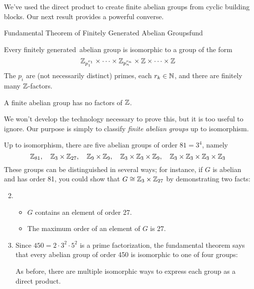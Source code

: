 We've used the direct product to create finite abelian groups from cyclic building blocks. Our next result provides a powerful converse.

\begin{thm}{Fundamental Theorem of Finitely Generated Abelian Groups}{fund}\par
Every finitely generated\footnotemark\ abelian group is isomorphic to a group of the form
\[\mathbb{Z}_{p_1^{r_1}}\times\cdots\times\mathbb{Z}_{p_n^{r_n}}\times\mathbb{Z}\times\cdots\times\mathbb{Z}\]
The $p_i$ are (not necessarily distinct) primes, each $r_k\in\mathbb{N}$, and there are finitely many $\mathbb{Z}$-factors.\par
A finite abelian group has no factors of $\mathbb{Z}$.
\end{thm}


We won't develop the technology necessary to prove this, but it is too useful to ignore. Our purpose is simply to classify \emph{finite abelian groups} up to isomorphism.

\goodbreak


\begin{examples}{}{}
\exstart Up to isomorphism, there are five abelian groups of order $81=3^4$, namely
\[\mathbb{Z}_{81},\quad \mathbb{Z}_3\times\mathbb{Z}_{27},\quad \mathbb{Z}_9\times\mathbb{Z}_9,\quad \mathbb{Z}_3\times\mathbb{Z}_3\times\mathbb{Z}_9,\quad \mathbb{Z}_3\times\mathbb{Z}_3\times\mathbb{Z}_3\times\mathbb{Z}_3\]
These groups can be distinguished in several ways; for instance, if $G$ is abelian and has order 81, you could show that $G\cong \mathbb{Z}_3\times\mathbb{Z}_{27}$ by demonstrating two facts:
\begin{enumerate}\setcounter{enumi}{1}
  \item[]\begin{itemize}\itemsep0pt
  	\item $G$ contains an element of order 27.
  	\item The maximum order of an element of $G$ is 27.
	\end{itemize}
  \item Since $450=2\cdot 3^2\cdot 5^2$ is a prime factorization, the fundamental theorem says that every abelian group of order 450 is isomorphic to one of four groups:
As before, there are multiple isomorphic ways to express each group as a direct product.
\end{enumerate}
\end{examples}



